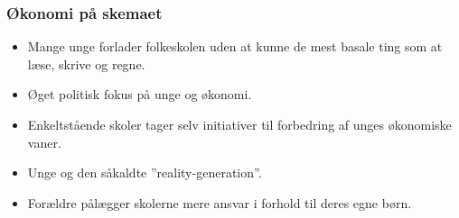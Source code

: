 
\begin{frame}
\frametitle{Økonomi på skemaet}
    \begin{itemize}
        \item{Mange unge forlader folkeskolen uden at kunne de mest basale ting som at læse, skrive og regne.}

        \item{Øget politisk fokus på unge og økonomi.}

        \item{Enkeltstående skoler tager selv initiativer til forbedring af unges økonomiske vaner.}

        \item{Unge og den såkaldte ''reality-generation''.}

        \item{Forældre pålægger skolerne mere ansvar i forhold til deres egne børn.}
    \end{itemize}
\end{frame}
    
